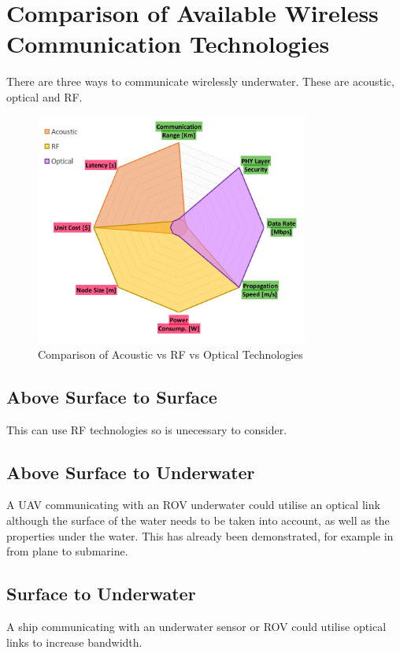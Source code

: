\section{Comparison of Available Wireless Communication Technologies}

There are three ways to communicate wirelessly underwater. These are
acoustic, optical and \ac{RF}.

\begin{figure}[H]
  \includegraphics[width=0.8\textwidth]{acoustic_rf_optical_comparison.png}
  \caption{Comparison of Acoustic vs RF vs Optical Technologies}
  \label{fig:acoustic_rf_optical_comparison}
\end{figure}

\subsection{Above Surface to Surface}
This can use RF technologies so is unecessary to consider.

\subsection{Above Surface to Underwater}
A \ac{UAV} communicating with an \ac{ROV} underwater could utilise an optical
link although the surface of the water needs to be taken into account, as well
as the properties under the water. This has already been demonstrated, for
example in \cite{autonomous_data_optical_relay_experiment} from plane to
submarine.

\subsection{Surface to Underwater}
A ship communicating with an underwater sensor or \ac{ROV} could utilise
optical links to increase bandwidth.

